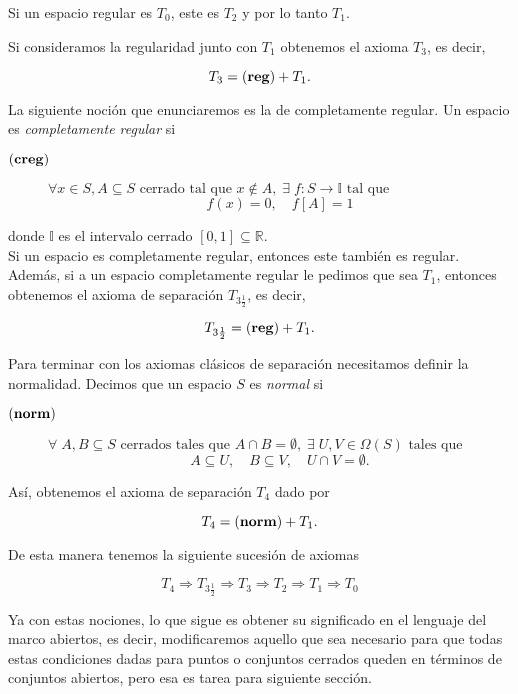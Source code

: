 \documentclass{comunicaciones}
\begin{document}
\begin{prop}
    Si un espacio regular es $T_0$, este es $T_2$ y por lo tanto $T_1$.
\end{prop}

Si consideramos la regularidad junto con $T_1$ obtenemos el axioma $T_3$, es decir, 

\[
T_3=(\mbox{\textbf{reg}}) + T_1.
\]

La siguiente noción que enunciaremos es la de completamente regular. Un espacio es \emph{completamente regular} si

\begin{description}
\item[$(\mbox{\textbf{creg}})$] $\forall x\in S, A\subseteq S \mbox{ cerrado tal que }x\notin A,\; \exists\; f\colon S\to \mathbb{I}  \mbox{ tal que }$
\[
f(x)=0,\quad f[A]=1
\]
\end{description}
donde $\mathbb{I}$ es el intervalo cerrado $[0,1]\subseteq \mathbb{R}$.\\

Si un espacio es completamente regular, entonces este también es regular. Además, si a un espacio completamente regular le pedimos que sea $T_1$, entonces obtenemos el axioma de separación $T_{3\frac{1}{2}}$, es decir,

\[
T_{3\frac{1}{2}}=(\mbox{\textbf{reg}}) + T_1.
\]

Para terminar con los axiomas clásicos de separación necesitamos definir la normalidad. Decimos que un espacio $S$ es \emph{normal} si 

\begin{description}
\item[$(\mbox{\textbf{norm}})$] $\forall\; A, B\subseteq S \mbox{ cerrados tales que } A\cap B=\emptyset,\; \exists\; U, V\in \Omega (S) \mbox{ tales que }$
\[
A\subseteq U,\quad B\subseteq V, \quad U\cap V=\emptyset.
\]
\end{description}

Así, obtenemos el axioma de separación $T_4$ dado por

\[
T_4=(\mbox{\textbf{norm}}) + T_1.
\]

De esta manera tenemos la siguiente sucesión de axiomas

\[
T_4\Rightarrow  T_{3\frac{1}{2}} \Rightarrow T_3 \Rightarrow T_2 \Rightarrow T_1 \Rightarrow T_0
\]

Ya con estas nociones, lo que sigue es obtener su significado en el lenguaje del marco abiertos, es decir, modificaremos aquello que sea necesario para que todas estas condiciones dadas para puntos o conjuntos cerrados queden en términos de conjuntos abiertos, pero esa es tarea para siguiente sección.
\end{document}
